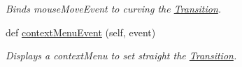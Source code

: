 \begin{DoxyCompactItemize}
\begin{DoxyCompactList}\small\item\em Binds mouse\+Move\+Event to curving the \mbox{\hyperlink{classTransition_1_1Transition}{Transition}}. \end{DoxyCompactList}\item 
\mbox{\label{classTransition_1_1Transition_aec4877c90b24e1042105fe26782e1d08}} 
def \mbox{\hyperlink{classTransition_1_1Transition_aec4877c90b24e1042105fe26782e1d08}{context\+Menu\+Event}} (self, event)
\begin{DoxyCompactList}\small\item\em Displays a context\+Menu to set straight the \mbox{\hyperlink{classTransition_1_1Transition}{Transition}}. \end{DoxyCompactList}\end{DoxyCompactItemize}

